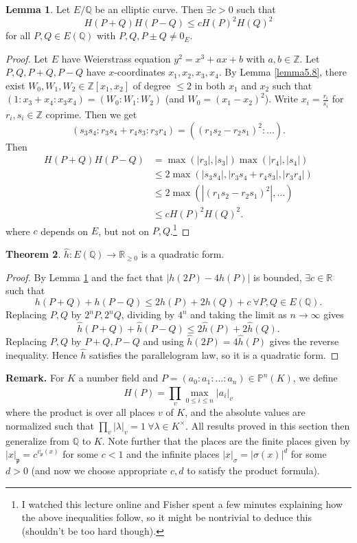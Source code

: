 \documentclass{article}
\theoremstyle{definition}
\newtheorem{theorem}{Theorem}[section]
\newtheorem{lemma}[theorem]{Lemma}
\begin{document}
\begin{lemma}\label{lemma13.6}
    Let $E/\mathbb{Q}$ be an elliptic curve. Then $\exists c>0$ such that
    \[
    H(P+Q)H(P-Q)\le cH(P)^2H(Q)^2
    \]
    for all $P,Q \in E(\mathbb{Q})$ with $P,Q,P\pm Q \neq 0_E$.
\end{lemma}
\begin{proof}
    Let $E$ have Weierstrass equation $y^2=x^3+ax+b$ with $a,b \in \mathbb{Z}$. Let $P,Q,P+Q,P-Q$ have $x$-coordinates $x_1,x_2,x_3,x_4$. By Lemma \ref{lemma5.8}, there exist $W_0,W_1,W_2 \in \mathbb{Z}[x_1,x_2]$ of degree $\le 2$ in both $x_1$ and $x_2$ such that $(1:x_3+x_4:x_3x_4) = (W_0:W_1:W_2)$ (and $W_0 = (x_1-x_2)^2$). Write $x_i = \frac{r_i}{s_i}$ for $r_i,s_i \in \mathbb{Z}$ coprime. Then we get 
    \[
    (s_3s_4:r_3s_4+r_4s_3:r_3r_4) = ((r_1s_2-r_2s_1)^2:\ldots).
    \]
    Then 
    \begin{align*}
        H(P+Q)H(P-Q) &= \max(\left|r_3\right|,\left|s_3\right|)\max(\left|r_4\right|,\left|s_4\right|) \\
        &\le 2\max(\left|s_3s_4\right|,\left|r_3s_4+r_4s_3\right|,\left|r_3r_4\right|)\\
        &\le 2 \max(\left|(r_1s_2-r_2s_1)^2\right|,\ldots) \\
        &\le c H(P)^2H(Q)^2.
    \end{align*}
    where $c$ depends on $E$, but not on $P,Q$.\footnote{I watched this lecture online and Fisher spent a few minutes explaining how the above inequalities follow, so it might be nontrivial to deduce this (shouldn't be too hard though).}
\end{proof}
\begin{theorem}\label{theorem13.7}
    $\widehat{h}:E(\mathbb{Q}) \to \mathbb{R}_{\ge 0}$ is a quadratic form.
\end{theorem}
\begin{proof}
    By Lemma \ref{lemma13.6} and the fact that $\left|h(2P)-4h(P)\right|$ is bounded, $\exists c \in \mathbb{R}$ such that 
    \[
    h(P+Q) + h(P-Q) \le 2h(P) + 2h(Q) + c ~\forall P,Q \in E(\mathbb{Q}).
    \]
    Replacing $P,Q$ by $2^nP,2^nQ$, dividing by $4^n$ and taking the limit as $n \to \infty$ gives \[
    \widehat{h}(P+Q) + \widehat{h}(P-Q) \le 2\widehat{h}(P)+2\widehat{h}(Q).
    \]
    Replacing $P,Q$ by $P+Q,P-Q$ and using $\widehat{h}(2P) = 4 \widehat{h}(P)$ gives the reverse inequality. Hence $\widehat{h}$ satisfies the parallelogram law, so it is a quadratic form.
\end{proof}
\textbf{Remark.} For $K$ a number field and $P = (a_0:a_1:\ldots:a_n) \in \mathbb{P}^n(K)$, we define \[
H(P) = \prod_{v}^{} \max_{0\le i\le n} \left|a_i\right|_v
\]
where the product is over all places $v$ of $K$, and the absolute values are normalized such that $\prod_{v}^{} \left|\lambda\right|_v =1 ~\forall \lambda \in K^\times$. All results proved in this section then generalize from $\mathbb{Q}$ to $K$. Note further that the places are the finite places given by $\left|x\right|_{\mathfrak{p}} = c^{v_{\mathfrak{p}}(x)}$ for some $c<1$ and the infinite places $\left|x\right|_{\sigma} = \left|\sigma(x)\right|^d$ for some $d>0$ (and now we choose appropriate $c,d$ to satisfy the product formula).
\end{document}
